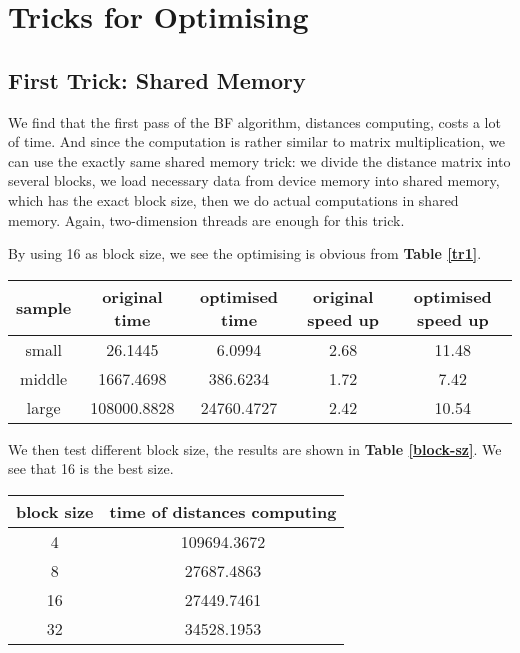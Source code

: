 \documentclass[11pt, a4paper]{article}
\makeatletter
\newcommand\tcaption{\def\@captype{table}\caption}
\newcommand{\tref}[1]{\textbf{Table \ref{#1}}}
\makeatother
\begin{document}
\section{Tricks for Optimising}

\subsection{First Trick: Shared Memory}

We find that the first pass of the BF algorithm, distances computing, costs a lot of time. And since the computation is rather similar to matrix multiplication, we can use the exactly same shared memory trick: we divide the distance matrix into several blocks, we load necessary data from device memory into shared memory, which has the exact block size, then we do actual computations in shared memory. Again, two-dimension threads are enough for this trick.

By using 16 as block size, we see the optimising is obvious from \tref{tr1}.

\begin{center}
    \tcaption{Time cost of distance computing using trick 1}\label{tr1}
    \begin{tabular}{ccccc}
        \toprule
        sample & original time & optimised time & original speed up & optimised speed up \\
        \midrule
        small & 26.1445 & 6.0994 & 2.68 & 11.48 \\
        middle & 1667.4698 & 386.6234 & 1.72 & 7.42 \\
        large & 108000.8828 & 24760.4727 & 2.42 & 10.54 \\
        \bottomrule
    \end{tabular}
\end{center}

We then test different block size, the results are shown in \tref{block-sz}. We see that 16 is the best size.

\begin{center}
    \tcaption{Performance on different block sizes}\label{block-sz}
    \begin{tabular}{cc}
        \toprule
        block size & time of distances computing \\
        \midrule
        4   & 109694.3672 \\
        8   & 27687.4863 \\
        16  & 27449.7461 \\
        32  & 34528.1953 \\
        \bottomrule
    \end{tabular}
\end{center}
\end{document}
